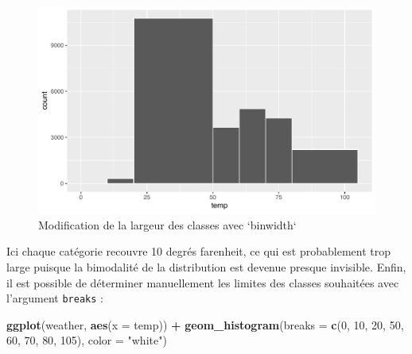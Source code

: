 \documentclass[a4paperpaper,]{article}
\newenvironment{Shaded}{\begin{snugshade}}{\end{snugshade}}
\newcommand{\KeywordTok}[1]{\textcolor[rgb]{0.13,0.29,0.53}{\textbf{#1}}}
\newcommand{\DataTypeTok}[1]{\textcolor[rgb]{0.13,0.29,0.53}{#1}}
\newcommand{\DecValTok}[1]{\textcolor[rgb]{0.00,0.00,0.81}{#1}}
\newcommand{\StringTok}[1]{\textcolor[rgb]{0.31,0.60,0.02}{#1}}
\newcommand{\OperatorTok}[1]{\textcolor[rgb]{0.81,0.36,0.00}{\textbf{#1}}}
\newcommand{\NormalTok}[1]{#1}
\theoremstyle{definition}
\theoremstyle{definition}
\theoremstyle{definition}
\theoremstyle{remark}
\begin{document}
\begin{figure}[htpb]

{\centering \includegraphics[width=0.9\linewidth]{figure/unnamed-chunk-51-1} 

}

\caption{Modification de la largeur des classes avec `binwidth`}\label{fig:unnamed-chunk-51}
\end{figure}

Ici chaque catégorie recouvre 10 degrés farenheit, ce qui est
probablement trop large puisque la bimodalité de la distribution est
devenue presque invisible. Enfin, il est possible de déterminer
manuellement les limites des classes souhaitées avec l'argument
\texttt{breaks} :

\begin{Shaded}
\begin{Highlighting}[]
\KeywordTok{ggplot}\NormalTok{(weather, }\KeywordTok{aes}\NormalTok{(}\DataTypeTok{x =}\NormalTok{ temp)) }\OperatorTok{+}
\StringTok{  }\KeywordTok{geom_histogram}\NormalTok{(}\DataTypeTok{breaks =} \KeywordTok{c}\NormalTok{(}\DecValTok{0}\NormalTok{, }\DecValTok{10}\NormalTok{, }\DecValTok{20}\NormalTok{, }\DecValTok{50}\NormalTok{, }\DecValTok{60}\NormalTok{, }\DecValTok{70}\NormalTok{, }\DecValTok{80}\NormalTok{, }\DecValTok{105}\NormalTok{), }\DataTypeTok{color =} \StringTok{"white"}\NormalTok{)}
\end{Highlighting}
\end{Shaded}
\end{document}
